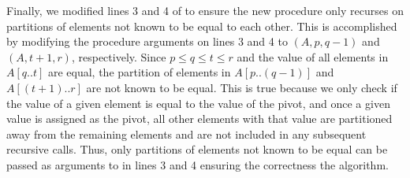 \documentclass[11pt]{article}
\theoremstyle{nonumberplain}
\begin{document}
\begin{enumerate}
Finally, we modified lines 3 and 4 of  to ensure the new procedure only recurses on partitions of elements not known to be equal to each other. This is accomplished by modifying the procedure arguments on lines 3 and 4 to $(A,p,q-1)$ and $(A,t+1,r)$, respectively. Since $p \le q \le t \le r$ and the value of all elements in $A[q..t]$ are equal, the partition of elements in $A[p..(q-1)]$ and $A[(t+1)..r]$ are not known to be equal. This is true because we only check if the value of a given element is equal to the value of the pivot, and once a given value is assigned as the pivot, all other elements with that value are partitioned away from the remaining elements and are not included in any subsequent recursive calls. Thus, only partitions of elements not known to be equal can be passed as arguments to  in lines 3 and 4 ensuring the correctness the algorithm. \\


\end{enumerate}
\end{document}
